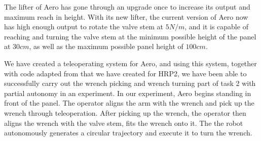\documentclass{standalone}
\begin{document}
The lifter of Aero has gone through an upgrade once to increase its output and maximum reach in height. With its new lifter, the current version of Aero now has high enough output to rotate the valve stem at $5N/m$, and it is capable of reaching and turning the valve stem at the minimum possible height of the panel at $30cm$, as well as the maximum possible panel height of $100cm$.

We have created a teleoperating system for Aero, and using this system, together with code adapted from that we have created for HRP2, we have been able to successfully carry out the wrench picking and wrench turning part of task 2 with partial autonomy in an experiment. In our experiment, Aero begins standing in front of the panel. The operator aligns the arm with the wrench and pick up the wrench through teleoperation. After picking up the wrench, the operator then aligns the wrench with the valve stem, fits the wrench onto it. The the robot autonomously generates a circular trajectory and execute it to turn the wrench.
\end{document}
